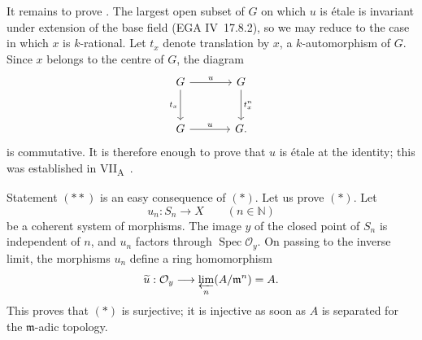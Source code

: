 It remains to prove . The largest open subset of \(G\) on
which \(u\) is étale is invariant under extension of the base field
(EGA IV~17.8.2), so we may reduce to the case in which \(x\) is
\(k\)-rational. Let \(t_x\) denote translation by \(x\), a
\(k\)-automorphism of \(G\). Since \(x\) belongs to the centre of
\(G\), the diagram
\[
\begin{tikzcd}[column sep=large,row sep=large]
G \arrow[r,"u"] \arrow[d,"t_x"'] & G \arrow[d,"t_x^n"] \\
G \arrow[r,"u"] & G .
\end{tikzcd}
\]
is commutative. It is therefore enough to prove that \(u\) is étale
at the identity; this was established in VII\textsubscript{A}~.





Statement \((\ast\ast)\) is an easy consequence of \((\ast)\). Let us
prove \((\ast)\). Let
\[
  u_n:S_n\longrightarrow X\qquad(n\in\mathbb N)
\]
be a coherent system of morphisms. The image \(y\) of the closed point
of \(S_n\) is independent of \(n\), and \(u_n\) factors through
\(\operatorname{Spec}\mathcal O_y\). On passing to the inverse limit,
the morphisms \(u_n\) define a ring homomorphism
\[
  \widetilde u:\mathcal O_y
  \longrightarrow
  \varprojlim_n(A/\mathfrak m^n)=A.
\]
This proves that \((\ast)\) is surjective; it is injective as soon as
\(A\) is separated for the \(\mathfrak m\)-adic topology.

